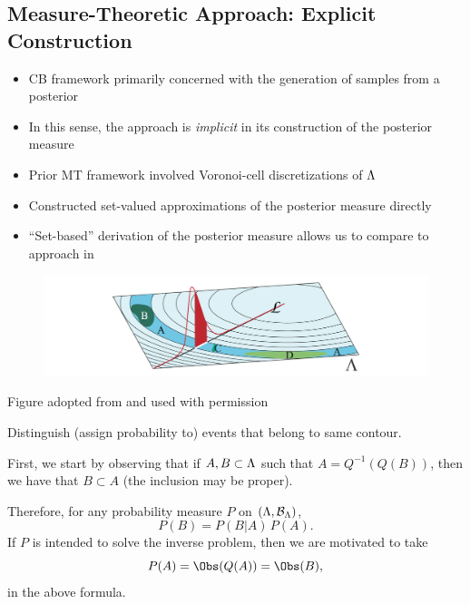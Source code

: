 \subsection{Measure-Theoretic Approach: Explicit Construction}
\begin{frame}[t]
\begin{itemize}[<-+->]
	\item <1-> CB framework primarily concerned with the generation of samples from a posterior
	\item <1-> In this sense, the approach is \emph{implicit} in its construction of the posterior measure
	\item <2-> Prior MT framework involved Voronoi-cell discretizations of ${\Lambda}$
	\item <2-> Constructed set-valued approximations of the posterior measure directly
	\item <3> ``Set-based'' derivation of the posterior measure allows us to compare to approach in ~\cite{BET+14}
\end{itemize}

\end{frame}

\begin{frame}[t]

\begin{figure}
\centering
	\includegraphics[width=1\textwidth]{images/troy_mt3contour}
\end{figure}
\begin{center}

{\scriptsize Figure adopted from \cite{BET+14-arxiv} and used with permission}

 Distinguish (assign probability to) events that belong to same contour. 
\end{center}
\end{frame}

\begin{frame}[t]
First, we start by observing that if $A, B \subset {\Lambda}$ such that $A = Q^{-1}(Q(B))$, then we have that $B\subset A$ (the inclusion may be proper).

Therefore, for any probability measure $P$ on $({\Lambda}, \mathcal{B}_{{\Lambda}})$, 
\[
P(B) = P(B|A) \, P(A).
\]
If $P$ is intended to solve the inverse problem, then we are motivated to take
\[
P(A) = \Obs (Q(A)) = \Obs (B),
\]
in the above formula.
\end{frame}


